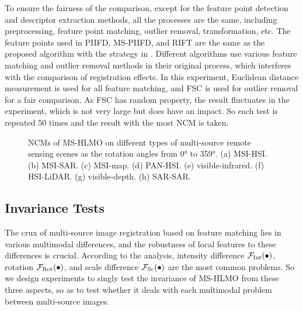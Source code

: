 To ensure the fairness of the comparison, except for the feature point detection and descriptor extraction methods, all the processes are the same, including preprocessing, feature point matching, outlier removal, transformation, etc. The feature points used in PIIFD, MS-PIIFD, and RIFT are the same as the proposed algorithm with the strategy in \cite{2021Multi}. Different algorithms use various feature matching and outlier removal methods in their original process, which interferes with the comparison of registration effects. In this experiment, Euclidean distance measurement is used for all feature matching, and FSC is used for outlier removal for a fair comparison. As FSC has random property, the result fluctuates in the experiment, which is not very large but does have an impact. So each test is repeated 50 times and the result with the most NCM is taken.



\begin{figure*}[!h]
    \centering
    \hfil
    \caption{NCMs of MS-HLMO on different types of multi-source remote sensing scenes as the rotation angles from 0° to 359°. (a) MSI-HSI. (b) MSI-SAR. (c) MSI-map. (d) PAN-HSI. (e) visible-infrared. (f) HSI-LiDAR. (g) visible-depth. (h) SAR-SAR.}
    \label{fig:rot}
\end{figure*}

\subsection{Invariance Tests}

The crux of multi-source image registration based on feature matching lies in various multimodal differences, and the robustness of local features to these differences is crucial. According to the analysis, intensity difference ${{\cal F}_{\rm{Int}}}( \bullet )$, rotation ${{\cal F}_{{\rm{Rot}}}}( \bullet )$, and scale difference ${{\cal F}_{{\rm{Sc}}}}( \bullet )$ are the most common problems. So we design experiments to singly test the invariance of MS-HLMO from these three aspects, so as to test whether it deals with each multimodal problem between multi-source images.


